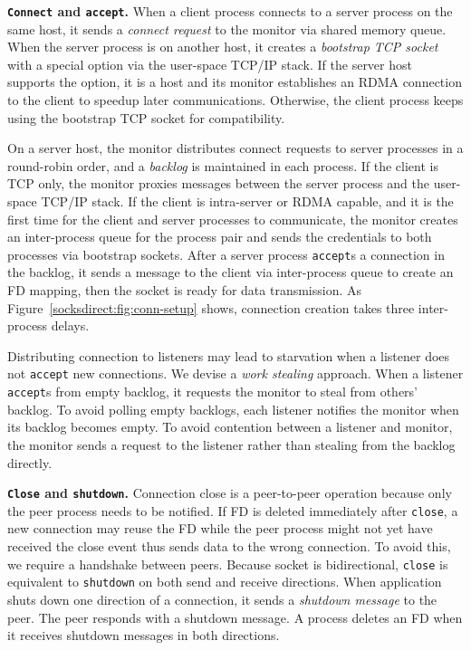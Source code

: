 \textbf{\texttt{Connect} and \texttt{accept}.}
When a client process connects to a server process on the same host, it sends a \textit{connect request} to the monitor via shared memory queue. When the server process is on another host, it creates a \textit{bootstrap TCP socket} with a special option via the user-space TCP/IP stack. If the server host supports the option, it is a \sys host and its monitor establishes an RDMA connection to the client to speedup later communications. Otherwise, the client process keeps using the bootstrap TCP socket for compatibility.

On a server host, the monitor distributes connect requests to server processes in a round-robin order, and a \textit{backlog} is maintained in each process. If the client is TCP only, the monitor proxies messages between the server process and the user-space TCP/IP stack. If the client is intra-server or RDMA capable, and it is the first time for the client and server processes to communicate, the monitor creates an inter-process queue for the process pair and sends the credentials to both processes via bootstrap sockets. After a server process \texttt{accept}s a connection in the backlog, it sends a message to the client via inter-process queue to create an FD mapping, then the socket is ready for data transmission. As Figure~\ref{socksdirect:fig:conn-setup} shows, connection creation takes three inter-process delays.

Distributing connection to listeners may lead to starvation when a listener does not \texttt{accept} new connections. We devise a \textit{work stealing} approach. When a listener \texttt{accept}s from empty backlog, it requests the monitor to steal from others' backlog. To avoid polling empty backlogs, each listener notifies the monitor when its backlog becomes empty. To avoid contention between a listener and monitor, the monitor sends a request to the listener rather than stealing from the backlog directly.


\textbf{\texttt{Close} and \texttt{shutdown}.}
Connection close is a peer-to-peer operation because only the peer process needs to be notified. If FD is deleted immediately after \texttt{close}, a new connection may reuse the FD while the peer process might not yet have received the close event thus sends data to the wrong connection. To avoid this, we require a handshake between peers.
Because socket is bidirectional, \texttt{close} is equivalent to \texttt{shutdown} on both send and receive directions.
When application shuts down one direction of a connection, it sends a \textit{shutdown message} to the peer. The peer responds with a shutdown message. A process deletes an FD when it receives shutdown messages in both directions.

